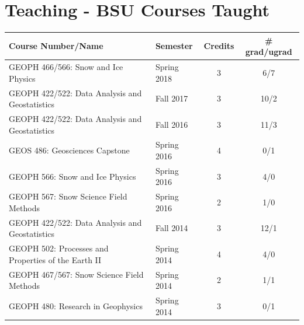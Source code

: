 \documentclass[11pt]{article}
\renewcommand\arraystretch{1}
\begin{document}
\begin{table}[!htbp]
\section*{Teaching - BSU Courses Taught}
\renewcommand\arraystretch{0.7}
  \centering
  \begin{tabular}{|l|l|c|c|}
\hline
\textbf{Course Number/Name} & \textbf{Semester} & \textbf{Credits} & \textbf{\# grad/ugrad} \\ \hline \hline

GEOPH 466/566: Snow and Ice Physics & Spring 2018 & 3 & 6/7 \\ \hline
GEOPH 422/522: Data Analysis and Geostatistics & Fall 2017 & 3 & 10/2 \\ \hline
GEOPH 422/522: Data Analysis and Geostatistics & Fall 2016 & 3 & 11/3 \\ \hline
GEOS 486: Geosciences Capstone & Spring 2016 & 4 & 0/1 \\ \hline
GEOPH 566: Snow and Ice Physics & Spring 2016 & 3 & 4/0 \\ \hline
GEOPH 567: Snow Science Field Methods & Spring 2016 & 2 & 1/0 \\ \hline
GEOPH 422/522: Data Analysis and Geostatistics & Fall 2014 & 3 & 12/1 \\ \hline
GEOPH 502: Processes and Properties of the Earth II & Spring 2014 & 4 & 4/0 \\ \hline
GEOPH 467/567: Snow Science Field Methods & Spring 2014 & 2 & 1/1 \\ \hline
GEOPH 480: Research in Geophysics & Spring 2014 & 3 & 0/1 \\ \hline

\end{tabular}
\end{table}
\end{document}
